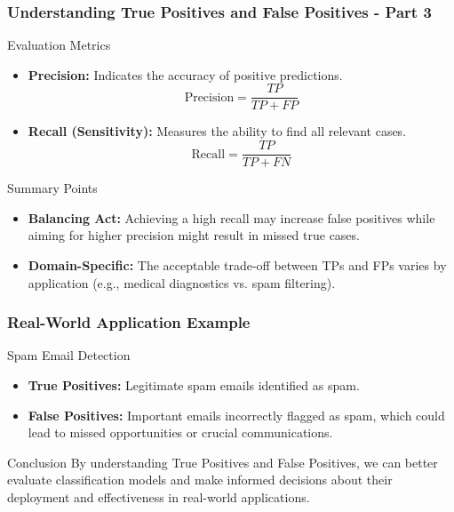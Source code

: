 \documentclass[aspectratio=169]{beamer}
\begin{document}
\begin{frame}[fragile]
  \frametitle{Understanding True Positives and False Positives - Part 3}
  \begin{block}{Evaluation Metrics}
    \begin{itemize}
      \item \textbf{Precision:} Indicates the accuracy of positive predictions.
      \begin{equation}
        \text{Precision} = \frac{TP}{TP + FP}
      \end{equation}
      \item \textbf{Recall (Sensitivity):} Measures the ability to find all relevant cases.
      \begin{equation}
        \text{Recall} = \frac{TP}{TP + FN}
      \end{equation}
    \end{itemize}
  \end{block}

  \begin{block}{Summary Points}
    \begin{itemize}
      \item \textbf{Balancing Act:} Achieving a high recall may increase false positives while aiming for higher precision might result in missed true cases.
      \item \textbf{Domain-Specific:} The acceptable trade-off between TPs and FPs varies by application (e.g., medical diagnostics vs. spam filtering).
    \end{itemize}
  \end{block}
\end{frame}

\begin{frame}[fragile]
  \frametitle{Real-World Application Example}
  \begin{block}{Spam Email Detection}
    \begin{itemize}
      \item \textbf{True Positives:} Legitimate spam emails identified as spam.
      \item \textbf{False Positives:} Important emails incorrectly flagged as spam, which could lead to missed opportunities or crucial communications.
    \end{itemize}
  \end{block}
  
  \begin{block}{Conclusion}
    By understanding True Positives and False Positives, we can better evaluate classification models and make informed decisions about their deployment and effectiveness in real-world applications.
  \end{block}
\end{frame}
\end{document}
